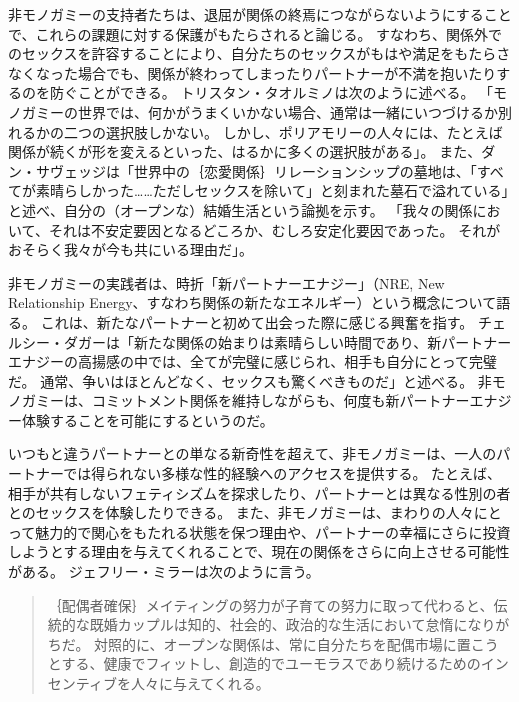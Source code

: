 \documentclass[paper=a4,book,openany]{jlreq}
\newcommand{\ig}[1]{}           %
\begin{document}
非モノガミーの支持者たちは、退屈が関係の終焉につながらないようにすることで、これらの課題に対する保護がもたらされると論じる。
すなわち、関係外でのセックスを許容することにより、自分たちのセックスがもはや満足をもたらさなくなった場合でも、関係が終わってしまったりパートナーが不満を抱いたりするのを防ぐことができる。
トリスタン・タオルミノは次のように述べる。
「モノガミーの世界では、何かがうまくいかない場合、通常は一緒にいつづけるか別れるかの二つの選択肢しかない。
しかし、ポリアモリーの人々には、たとえば関係が続くが形を変えるといった、はるかに多くの選択肢がある」\citep[p.217]{taormino08:_openin_up}。
また、ダン・サヴェッジは「世界中の｛恋愛関係｝{リレーションシップ}の墓地は、「すべてが素晴らしかった……ただしセックスを除いて」と刻まれた墓石で溢れている」と述べ、自分の（オープンな）結婚生活という論拠を示す。
「我々の関係において、それは不安定要因となるどころか、むしろ安定化要因であった。
それがおそらく我々が今も共にいる理由だ」\citep{oppenheimer11:_married_infid}。

非モノガミーの実践者は、時折「新パートナーエナジー」（NRE, New Relationship Energy、すなわち関係の新たなエネルギー）という概念について語る。
これは、新たなパートナーと初めて出会った際に感じる興奮を指す。
チェルシー・ダガーは「新たな関係の始まりは素晴らしい時間であり、新パートナーエナジーの高揚感の中では、全てが完璧に感じられ、相手も自分にとって完璧だ。
通常、争いはほとんどなく、セックスも驚くべきものだ」と述べる\citep{dagger18:_weve_all_been_there}。
非モノガミーは、コミットメント関係を維持しながらも、何度も新パートナーエナジー体験することを可能にするというのだ。

いつもと違うパートナーとの単なる新奇性を超えて、非モノガミーは、一人のパートナーでは得られない多様な性的経験へのアクセスを提供する。
たとえば、相手が共有しないフェティシズムを探求したり、パートナーとは異なる性別の者とのセックスを体験したりできる。
また、非モノガミーは、まわりの人々にとって魅力的で関心をもたれる状態を保つ理由や、パートナーの幸福にさらに投資しようとする理由を与えてくれることで、現在の関係をさらに向上させる可能性がある。
ジェフリー・ミラー\ig{Geoffrey Miller}は次のように言う。

\begin{quote}
｛配偶者確保｝{メイティング}の努力が子育ての努力に取って代わると、伝統的な既婚カップルは知的、社会的、政治的な生活において怠惰になりがちだ。
対照的に、オープンな関係は、常に自分たちを配偶市場に置こうとする、健康でフィットし、創造的でユーモラスであり続けるためのインセンティブを人々に与えてくれる。
\citep{miller19:_polyam_is_growin}

\end{quote}
\end{document}
